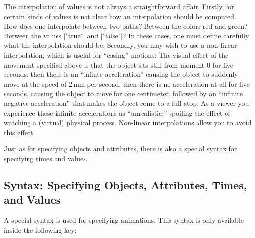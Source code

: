 The interpolation of values is not always a straightforward affair.
Firstly, for certain kinds of values is not clear how an interpolation
should be computed. How does one interpolate between two paths?
Between the colors red and green? Between the values |"true"| and
|"false"|? In these cases, one must define carefully what the
interpolation should be. Secondly, you may wish to use a non-linear
interpolation, which is useful for ``easing'' motions: The visual
effect of the movement 
specified above is that the object sits still from moment $0$ for five
seconds, then there is an ``infinte acceleration'' causing the object
to suddenly move at the speed of 2\,mm per second, then there is no
acceleration at all for five seconds, causing the object to move for
one centimeter, followed by an ``infinite negative acceleration'' that
makes the object come to a full stop. As a viewer you experience these
infinite accelerations as ``unrealistic,'' spoiling the effect of
watching a (virtual) physical process. Non-linear interpolations allow
you to avoid this effect. 

Just as for specifying objects and attributes, there is also a special
syntax for specifying times and values.


\subsection{Syntax: Specifying Objects, Attributes, Times, and Values}

\label{section-anim-syntax-animate}

A special syntax is used for specifying animations. This syntax is
only available inside the following key:

